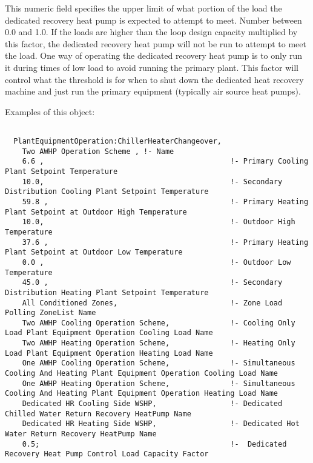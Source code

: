 This numeric field specifies the upper limit of what portion of the load the dedicated recovery heat pump is expected to attempt to meet.  Number between 0.0 and 1.0.  If the loads are higher than the loop design capacity multiplied by this factor, the dedicated recovery heat pump will not be run to attempt to meet the load.  One way of operating the dedicated recovery heat pump is to only run it during times of low load to avoid running the primary plant.  This factor will control what the threshold is for when to shut down the dedicated heat recovery machine and just run the primary equipment (typically air source heat pumps). 

Examples of this object:

\begin{lstlisting}

  PlantEquipmentOperation:ChillerHeaterChangeover,
    Two AWHP Operation Scheme , !- Name
    6.6 ,                                           !- Primary Cooling Plant Setpoint Temperature
    10.0,                                           !- Secondary Distribution Cooling Plant Setpoint Temperature
    59.8 ,                                          !- Primary Heating Plant Setpoint at Outdoor High Temperature
    10.0,                                           !- Outdoor High Temperature
    37.6 ,                                          !- Primary Heating Plant Setpoint at Outdoor Low Temperature
    0.0 ,                                           !- Outdoor Low Temperature
    45.0 ,                                          !- Secondary Distribution Heating Plant Setpoint Temperature
    All Conditioned Zones,                          !- Zone Load Polling ZoneList Name
    Two AWHP Cooling Operation Scheme,              !- Cooling Only Load Plant Equipment Operation Cooling Load Name
    Two AWHP Heating Operation Scheme,              !- Heating Only Load Plant Equipment Operation Heating Load Name
    One AWHP Cooling Operation Scheme,              !- Simultaneous Cooling And Heating Plant Equipment Operation Cooling Load Name
    One AWHP Heating Operation Scheme,              !- Simultaneous Cooling And Heating Plant Equipment Operation Heating Load Name
    Dedicated HR Cooling Side WSHP,                 !- Dedicated Chilled Water Return Recovery HeatPump Name
    Dedicated HR Heating Side WSHP,                 !- Dedicated Hot Water Return Recovery HeatPump Name
    0.5;                                            !-  Dedicated Recovery Heat Pump Control Load Capacity Factor
   

\end{lstlisting}
